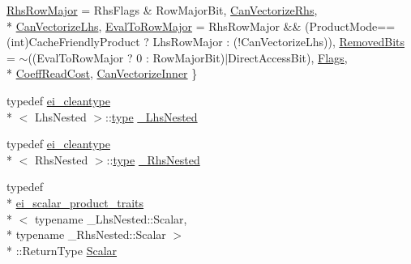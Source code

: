 \begin{DoxyCompactItemize}
\hyperlink{structei__traits_3_01_product_3_01_lhs_nested_00_01_rhs_nested_00_01_product_mode_01_4_01_4_a6fcc8e87c3f5c48cb405ea760c323695a639bf38566b6b235c4c84534a1cbf45a}{Rhs\-Row\-Major} = Rhs\-Flags \& Row\-Major\-Bit, 
\hyperlink{structei__traits_3_01_product_3_01_lhs_nested_00_01_rhs_nested_00_01_product_mode_01_4_01_4_a6fcc8e87c3f5c48cb405ea760c323695aa5486c06e3185fb33b324e0faf5776c9}{Can\-Vectorize\-Rhs}, 
\\*
\hyperlink{structei__traits_3_01_product_3_01_lhs_nested_00_01_rhs_nested_00_01_product_mode_01_4_01_4_a6fcc8e87c3f5c48cb405ea760c323695abd7baebda483a1079c8773578554d1e1}{Can\-Vectorize\-Lhs}, 
\hyperlink{structei__traits_3_01_product_3_01_lhs_nested_00_01_rhs_nested_00_01_product_mode_01_4_01_4_a6fcc8e87c3f5c48cb405ea760c323695affb5001d233e270d719ca24bdc86146c}{Eval\-To\-Row\-Major} = Rhs\-Row\-Major \&\& (Product\-Mode==(int)Cache\-Friendly\-Product ? Lhs\-Row\-Major \-: (!\-Can\-Vectorize\-Lhs)), 
\hyperlink{structei__traits_3_01_product_3_01_lhs_nested_00_01_rhs_nested_00_01_product_mode_01_4_01_4_a6fcc8e87c3f5c48cb405ea760c323695a3b48347ad24be8f7caa3dc084a1b72fe}{Removed\-Bits} = $\sim$((Eval\-To\-Row\-Major ? 0 \-: Row\-Major\-Bit)$|$\-Direct\-Access\-Bit), 
\hyperlink{structei__traits_3_01_product_3_01_lhs_nested_00_01_rhs_nested_00_01_product_mode_01_4_01_4_a6fcc8e87c3f5c48cb405ea760c323695abcd45bf0e7eb3dc6650b561de5358467}{Flags}, 
\\*
\hyperlink{structei__traits_3_01_product_3_01_lhs_nested_00_01_rhs_nested_00_01_product_mode_01_4_01_4_a6fcc8e87c3f5c48cb405ea760c323695a79453b62db94359ca1de97c6ec759019}{Coeff\-Read\-Cost}, 
\hyperlink{structei__traits_3_01_product_3_01_lhs_nested_00_01_rhs_nested_00_01_product_mode_01_4_01_4_a6fcc8e87c3f5c48cb405ea760c323695ac2079031a5e37ec96a9524b26d7696c7}{Can\-Vectorize\-Inner}
 \}
\item 
typedef \hyperlink{structei__cleantype}{ei\-\_\-cleantype}\\*
$<$ Lhs\-Nested $>$\-::\hyperlink{glext_8h_a7d05960f4f1c1b11f3177dc963a45d86}{type} \hyperlink{structei__traits_3_01_product_3_01_lhs_nested_00_01_rhs_nested_00_01_product_mode_01_4_01_4_a86d93068944e008d4609fe6e8ce51db2}{\-\_\-\-Lhs\-Nested}
\item 
typedef \hyperlink{structei__cleantype}{ei\-\_\-cleantype}\\*
$<$ Rhs\-Nested $>$\-::\hyperlink{glext_8h_a7d05960f4f1c1b11f3177dc963a45d86}{type} \hyperlink{structei__traits_3_01_product_3_01_lhs_nested_00_01_rhs_nested_00_01_product_mode_01_4_01_4_ae80ff0cd7f36460284383cf28e007eca}{\-\_\-\-Rhs\-Nested}
\item 
typedef \\*
\hyperlink{structei__scalar__product__traits}{ei\-\_\-scalar\-\_\-product\-\_\-traits}\\*
$<$ typename \-\_\-\-Lhs\-Nested\-::\-Scalar, \\*
typename \-\_\-\-Rhs\-Nested\-::\-Scalar $>$\\*
\-::Return\-Type \hyperlink{structei__traits_3_01_product_3_01_lhs_nested_00_01_rhs_nested_00_01_product_mode_01_4_01_4_a565565d97c9296ca348f303e3859dce2}{Scalar}
\end{DoxyCompactItemize}


